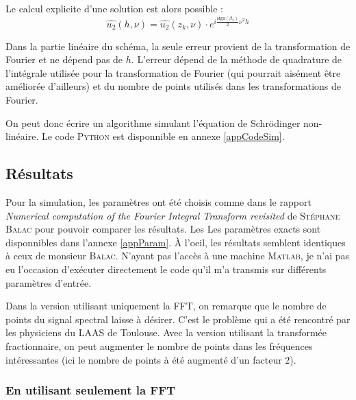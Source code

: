 \documentclass{article}
\begin{document}
Le calcul explicite d'une solution est alors possible :
\begin{equation}
  \hat{u_2}(h, \nu) 
= \hat{u_2}(z_k, \nu) \cdot e^{i\frac{\text{sign}(\beta_2)}{2} \nu^2 h} \label{eq_lin_solve}
\end{equation}

Dans la partie linéaire du schéma, la seule erreur provient de la transformation de Fourier et ne dépend pas de $h$. L'erreur dépend de la méthode de quadrature de l'intégrale utilisée pour la transformation de Fourier (qui pourrait aisément être améliorée d'ailleurs) et du nombre de points utilisés dans les transformations de Fourier.

On peut donc écrire un algorithme simulant l'équation de Schrödinger non-linéaire. Le code \textsc{Python} est disponnible en annexe \ref{appCodeSim}.

\subsection{Résultats}

Pour la simulation, les paramètres ont été choisis comme dans le rapport \emph{Numerical computation of the Fourier Integral Transform revisited} de \textsc{Stéphane Balac} pour pouvoir comparer les résultats. Les Les paramètres exacts sont disponnibles dans l'annexe \ref{appParam}.
À l'oeil, les résultats semblent identiques à ceux de monsieur \textsc{Balac}. N'ayant  pas l'accès à une machine \textsc{Matlab}, je n'ai pas eu l'occasion d'exécuter directement le code qu'il m'a transmis sur différents paramètres d'entrée.

Dans la version utilisant uniquement la FFT, on remarque que le nombre de points du signal spectral laisse à désirer. C'est le problème qui a été rencontré par les physiciens du LAAS de Toulouse. Avec la version utilisant la transformée fractionnaire, on peut augmenter le nombre de points dans les fréquences intéressantes (ici le nombre de points à été augmenté d'un facteur $2$). 
\subsubsection{En utilisant seulement la FFT}

\begin{center}
\end{center}
\end{document}
